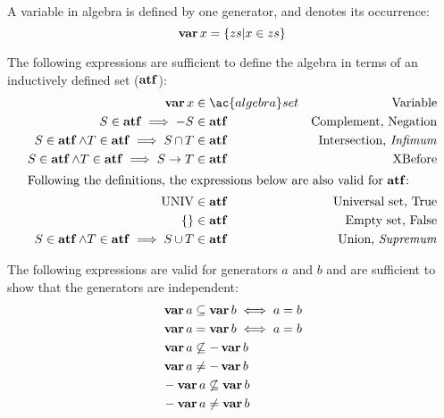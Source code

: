 \documentclass[12pt,openright,twoside,a4paper,oldfontcommands,english,brazil,draft]{abntex2}
\theoremstyle{theo}
\def\varop{\ensuremath\operatorname{\mathbf{var}}}
\newcommand{\var}[1]{\ensuremath\varop #1}
\def\xbeforeop{\ensuremath\rightarrow}
\newcommand{\xbefore}[2]{\ensuremath #1 \xbeforeop #2 }
\def\True{\ensuremath\operatorname{UNIV}}
\def\False{\ensuremath\operatorname{\left\{\right\}}}
\def\algebraset{\ensuremath\operatorname{\mathbf{atf}}}
\newcommand{\setsin}[1]{\ensuremath\left\{ #1 \right\}}
\def\union{\ensuremath\operatorname{\cup}}
\def\inter{\ensuremath\operatorname{\cap}}
\begin{document}
A variable in \ac{algebra} is defined by one generator, and denotes its occurrence:
%
\begin{equation}
\label{def:var}
\var{x} =
  \setsin{
    zs | x \in zs
  }
\end{equation}

The following expressions are sufficient to define the \ac{algebra} in terms of an inductively defined set ($\algebraset$):
%
\begin{subequations}
\label{def:algebraset}
\begin{align}
\var x & \in \ac{algebra}set & \text{Variable}\label{def:algebraset-var}\\
S \in \algebraset \implies -S & \in \algebraset & \text{Complement, Negation}\label{def:algebraset-compl}\\
S \in \algebraset \land T \in \algebraset \implies S \inter T & \in \algebraset & \text{Intersection, \emph{Infimum}}\label{def:algebraset-inf}\\
S \in \algebraset \land T \in \algebraset \implies \xbefore{S}{T} & \in \algebraset & \text{XBefore}\label{def:algebraset-xbefore}\\
\intertext{Following the definitions, the expressions below are also valid for $\algebraset$:}
\True &\in \algebraset & \text{Universal set, True}\label{def:algebraset-true}\\
\False &\in \algebraset & \text{Empty set, False}\label{def:algebraset-false}\\
S \in \algebraset \land T \in \algebraset \implies S \union T &\in \algebraset & \text{Union, \emph{Supremum}}\label{def:algebraset-sup}
\end{align}
\end{subequations}

The following expressions are valid for generators $a$ and $b$ and are sufficient to show that the generators are independent:
%
\begin{subequations}
\label{eqs:generators-independence}
\begin{align}
&\var a \subseteq \var b \iff a = b\label{eqs:generators-independence-subseteq-eq}\\
&\var a = \var b \iff a = b\\
&\var a \not\subseteq - \var b\\
&\var a \neq -\var b\label{eqs:generators-independence-subseteq-neq-compl} \\
&- \var a \not\subseteq \var b\\
&- \var a \neq \var b\label{eqs:generators-independence-subseteq-compl-neq}
\end{align}
\end{subequations}
\end{document}
